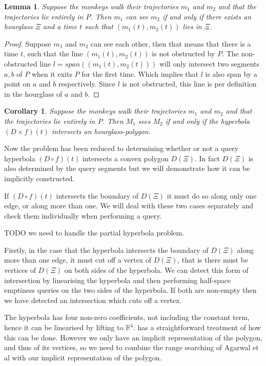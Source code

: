 \documentclass{article}
\newcommand{\patrick}[1]{\todo[color=purple!25!white]{Patrick: #1}\xspace}
\newtheorem{lemma}{Lemma}
\newtheorem{corollary}{Corollary}
\begin{document}
\begin{lemma}
  \label{lem:hourglass}
  Suppose the monkeys walk their trajectories $m_1$ and $m_2$ and that the trajectories lie entirely in $P$. Then $m_1$ can see $m_2$ if and only if there exists\patrick{What does it mean for an hourglass to exist?} an hourglass $\Xi$ and a time $t$ such that $(m_1(t), m_2(t))$ lies in $\Xi$.
\end{lemma}
\begin{proof}
  Suppose $m_1$ and $m_2$ can see each other, then that means that there is a time $t$, such that the line $(m_1(t), m_2(t))$ is not obstructed by $P$. The non-obstructed line $l = span((m_1(t), m_2(t)))$ will only intersect two segments $a,b$ of $P$ when it exits $P$ for the first time. Which implies that $l$ is also span by a point on $a$ and $b$ respectively. Since $l$ is not obstructed, this line is per definition in the hourglass of $a$ and $b$. 
\end{proof}

\begin{corollary}
  Suppose the monkeys walk their trajectories $m_1$ and $m_2$ and that the trajectories lie entirely in $P$. Then $M_1$ sees $M_2$ if and only if the hyperbola $(D \times f)(t)$ intersects an hourglass-polygon.
\end{corollary}

Now the problem has been reduced to determining whether or not a query hyperbola $(D \circ f)(t)$ intersects a convex polygon $D(\Xi)$. In fact $D(\Xi)$ is also determined by the query segments but we will demonstrate how it can be implicitly constructed.

If $(D \circ f)(t)$ intersects the boundary of $D(\Xi)$ it must do so along only one edge, or along more than one. We will deal with these two cases separately and check them individually when performing a query.

TODO we need to handle the partial hyperbola problem.

Firstly, in the case that the hyperbola intersects the boundary of $D(\Xi)$ along more than one edge, it must cut off a vertex of $D(\Xi)$, that is there must be vertices of $D(\Xi)$ on both sides of the hyperbola. We can detect this form of intersection by linearising the hyperbola and then performing half-space emptiness queries on the two sides of the hyperbola. If both are non-empty then we have detected an intersection which cuts off a vertex.

The hyperbola has four non-zero coefficients, not including the constant term, hence it can be linearised by lifting to $\mathbb{R}^4$. \cite{AgarwalM94} has a straightforward treatment of how this can be done. However we only have an implicit representation of the polygon, and thus of its vertices, so we need to combine the range searching of Agarwal et al with our implicit representation of the polygon.
\end{document}
